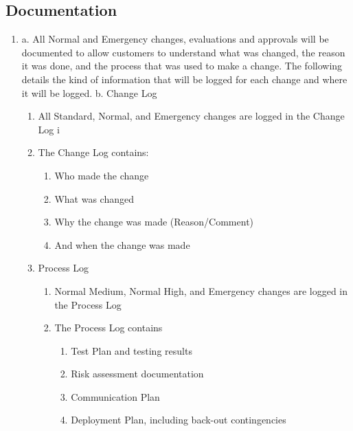 \documentclass[../main.tex]{subfiles}
\begin{document}
\subsection{Documentation}
\begin{enumerate}
    \item a.	All Normal and Emergency changes, evaluations and approvals will be documented to allow customers to understand what was changed, the reason it was done, and the process that was used to make a change. The following details the kind of information that will be logged for each change and where it will be logged.
    b.	Change Log
    \begin{enumerate}
        \item All Standard, Normal, and Emergency changes are logged in the Change Log
        i\item The Change Log contains: 
        \begin{enumerate}
            \item Who made the change 
            \item What was changed 
            \item Why the change was made (Reason/Comment)
            \item And when the change was made
        \end{enumerate}
        \item Process Log
        \begin{enumerate}
            \item Normal Medium, Normal High, and Emergency changes are logged in the Process Log
            \item The Process Log contains
            \begin{enumerate}
                \item Test Plan and testing results 
                \item Risk assessment documentation 
                \item Communication Plan 
                \item Deployment Plan, including back-out contingencies
            \end{enumerate}
        \end{enumerate}
    \end{enumerate}
\end{enumerate}
\end{document}
